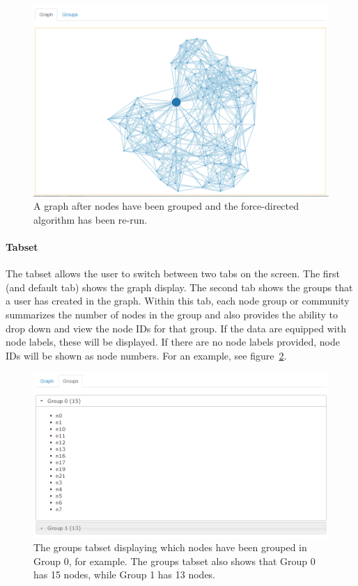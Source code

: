 \documentclass{article}\usepackage[]{graphicx}\usepackage[]{color}
\begin{document}
\begin{figure}[H]
\centering
\includegraphics[width=\textwidth]{images/graphgroup.png}
\caption{\label{fig:graphgroup} A graph after nodes have been grouped and the force-directed algorithm has been re-run.}
\end{figure}

\paragraph{Tabset} \label{par:group}
The tabset allows the user to switch between two tabs on the screen. The first (and default tab) shows the graph display. The second tab shows the groups that a user has created in the graph. Within this tab, each node group or community summarizes the number of nodes in the group and also provides the ability to drop down and view the node IDs for that group. If the data are equipped with node labels, these will be displayed. If there are no node labels provided, node IDs will be shown as node numbers. For an example, see figure~\ref{fig:groupstab}.

\begin{figure}[H]
\centering
\includegraphics[width=\textwidth]{images/groupstab.png}
\caption{\label{fig:groupstab} The groups tabset displaying which nodes have been grouped in Group 0, for example. The groups tabset also shows that Group 0 has 15 nodes, while Group 1 has 13 nodes.}
\end{figure}
\end{document}
